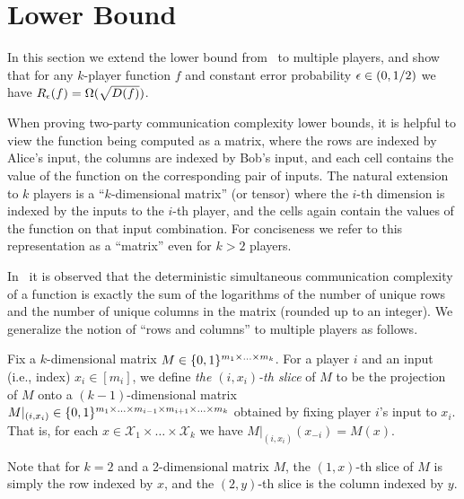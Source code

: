 \section{Lower Bound}
\label{sec:lower}

In this section we extend the lower bound from~\cite{BK97} to multiple players, and show that for any $k$-player function $f$ and constant error probability $\epsilon \in (0,1/2)$ we have $R_\epsilon(f) = \Omega(\sqrt{D(f)})$.

When proving two-party communication complexity lower bounds, it is helpful to view the function being computed as a matrix, where the rows are indexed by Alice's input, the columns are indexed by Bob's input, and each cell contains the value of the function on the corresponding pair of inputs. The natural extension to $k$ players is a ``$k$-dimensional matrix'' (or tensor) where the $i$-th dimension is indexed by the inputs to the $i$-th player, and the cells again contain the values of the function on that input combination. For conciseness we refer to this representation as a ``matrix'' even for $k > 2$ players.

In~\cite{BK97} it is observed that the deterministic simultaneous communication complexity of a function is exactly the sum of the logarithms of the number of unique rows and the number of unique columns in the matrix (rounded up to an integer). We generalize the notion of ``rows and columns'' to multiple players as follows.

\begin{definition}[Slice]
	Fix a $k$-dimensional matrix $M \in \{ 0,1 \}^{m_1 \times \ldots \times m_k}$.
	For a player $i$ and an input (i.e., index) $x_i \in [m_i]$,
	we define
	\emph{the $(i,x_i)$-th slice} of $M$ to be the projection of $M$ onto a $(k-1)$-dimensional matrix $M|_{(i,x_i)} \in \{ 0,1 \}^{m_1 \times \ldots \times m_{i-1} \times m_{i+1} \times \ldots \times m_k}$ obtained by fixing player $i$'s input to $x_i$.
	That is, for each
	$x \in \mathcal{X}_1 \times \ldots \times \mathcal{X}_k$
	we have
	$M|_{(i,x_i)}(x_{-i}) = M(x)$.
\end{definition}

Note that for $k = 2$ and a 2-dimensional matrix $M$, the $(1,x)$-th slice of $M$ is simply the row indexed by $x$, and the $(2,y)$-th slice
is the column indexed by $y$.

